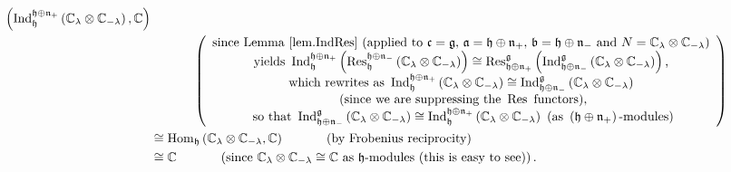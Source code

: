 \documentclass[etingof-lie.tex]{subfiles}
\begin{document}
\begin{align*}
{}\left(  \operatorname*{Ind}\nolimits_{\mathfrak{h}}^{\mathfrak{h}%
\oplus\mathfrak{n}_{+}}\left(  \mathbb{C}_{\lambda}\otimes\mathbb{C}%
_{-\lambda}\right)  ,\mathbb{C}\right) \\
&  \ \ \ \ \ \ \ \ \ \ \left(
\begin{array}
[c]{c}%
\text{since Lemma \ref{lem.IndRes} (applied to }\mathfrak{c}=\mathfrak{g}%
\text{, }\mathfrak{a}=\mathfrak{h}\oplus\mathfrak{n}_{+}\text{, }%
\mathfrak{b}=\mathfrak{h}\oplus\mathfrak{n}_{-}\text{ and }N=\mathbb{C}%
_{\lambda}\otimes\mathbb{C}_{-\lambda}\text{)}\\
\text{yields }\operatorname*{Ind}\nolimits_{\mathfrak{h}}^{\mathfrak{h}%
\oplus\mathfrak{n}_{+}}\left(  \operatorname*{Res}\nolimits_{\mathfrak{h}%
}^{\mathfrak{h}\oplus\mathfrak{n}_{-}}\left(  \mathbb{C}_{\lambda}%
\otimes\mathbb{C}_{-\lambda}\right)  \right)  \cong\operatorname*{Res}%
\nolimits_{\mathfrak{h}\oplus\mathfrak{n}_{+}}^{\mathfrak{g}}\left(
\operatorname*{Ind}\nolimits_{\mathfrak{h}\oplus\mathfrak{n}_{-}%
}^{\mathfrak{g}}\left(  \mathbb{C}_{\lambda}\otimes\mathbb{C}_{-\lambda
}\right)  \right)  \text{,}\\
\text{which rewrites as }\operatorname*{Ind}\nolimits_{\mathfrak{h}%
}^{\mathfrak{h}\oplus\mathfrak{n}_{+}}\left(  \mathbb{C}_{\lambda}%
\otimes\mathbb{C}_{-\lambda}\right)  \cong\operatorname*{Ind}%
\nolimits_{\mathfrak{h}\oplus\mathfrak{n}_{-}}^{\mathfrak{g}}\left(
\mathbb{C}_{\lambda}\otimes\mathbb{C}_{-\lambda}\right) \\
\text{ (since we are suppressing the }\operatorname*{Res}\text{ functors),}\\
\text{ so that }\operatorname*{Ind}\nolimits_{\mathfrak{h}\oplus
\mathfrak{n}_{-}}^{\mathfrak{g}}\left(  \mathbb{C}_{\lambda}\otimes
\mathbb{C}_{-\lambda}\right)  \cong\operatorname*{Ind}\nolimits_{\mathfrak{h}%
}^{\mathfrak{h}\oplus\mathfrak{n}_{+}}\left(  \mathbb{C}_{\lambda}%
\otimes\mathbb{C}_{-\lambda}\right)  \text{ (as }\left(  \mathfrak{h}%
\oplus\mathfrak{n}_{+}\right)  \text{-modules)}%
\end{array}
\right) \\
&  \cong\operatorname*{Hom}\nolimits_{\mathfrak{h}}\left(  \mathbb{C}%
_{\lambda}\otimes\mathbb{C}_{-\lambda},\mathbb{C}\right)
\ \ \ \ \ \ \ \ \ \ \left(  \text{by Frobenius reciprocity}\right) \\
&  \cong\mathbb{C}\ \ \ \ \ \ \ \ \ \ \left(  \text{since }\mathbb{C}%
_{\lambda}\otimes\mathbb{C}_{-\lambda}\cong\mathbb{C}\text{ as }%
\mathfrak{h}\text{-modules (this is easy to see)}\right)  .
\end{align*}
\end{document}
